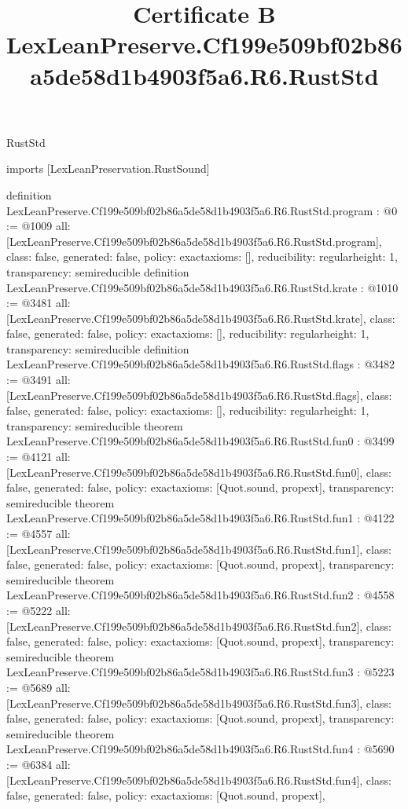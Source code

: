 \begin{lexlean}{RustStd}
\title{Certificate B LexLeanPreserve.Cf199e509bf02b86a5de58d1b4903f5a6.R6.RustStd}
\begin{coremodule}
imports [LexLeanPreservation.RustSound]

definition LexLeanPreserve.Cf199e509bf02b86a5de58d1b4903f5a6.R6.RustStd.program : @0 := @1009 {
  all: [LexLeanPreserve.Cf199e509bf02b86a5de58d1b4903f5a6.R6.RustStd.program],
  class: false,
  generated: false,
  policy: exact{axioms: []},
  reducibility: regular{height: 1},
  transparency: semireducible
}
definition LexLeanPreserve.Cf199e509bf02b86a5de58d1b4903f5a6.R6.RustStd.krate : @1010 := @3481 {
  all: [LexLeanPreserve.Cf199e509bf02b86a5de58d1b4903f5a6.R6.RustStd.krate],
  class: false,
  generated: false,
  policy: exact{axioms: []},
  reducibility: regular{height: 1},
  transparency: semireducible
}
definition LexLeanPreserve.Cf199e509bf02b86a5de58d1b4903f5a6.R6.RustStd.flags : @3482 := @3491 {
  all: [LexLeanPreserve.Cf199e509bf02b86a5de58d1b4903f5a6.R6.RustStd.flags],
  class: false,
  generated: false,
  policy: exact{axioms: []},
  reducibility: regular{height: 1},
  transparency: semireducible
}
theorem LexLeanPreserve.Cf199e509bf02b86a5de58d1b4903f5a6.R6.RustStd.fun0 : @3499 := @4121 {
  all: [LexLeanPreserve.Cf199e509bf02b86a5de58d1b4903f5a6.R6.RustStd.fun0],
  class: false,
  generated: false,
  policy: exact{axioms: [Quot.sound, propext]},
  transparency: semireducible
}
theorem LexLeanPreserve.Cf199e509bf02b86a5de58d1b4903f5a6.R6.RustStd.fun1 : @4122 := @4557 {
  all: [LexLeanPreserve.Cf199e509bf02b86a5de58d1b4903f5a6.R6.RustStd.fun1],
  class: false,
  generated: false,
  policy: exact{axioms: [Quot.sound, propext]},
  transparency: semireducible
}
theorem LexLeanPreserve.Cf199e509bf02b86a5de58d1b4903f5a6.R6.RustStd.fun2 : @4558 := @5222 {
  all: [LexLeanPreserve.Cf199e509bf02b86a5de58d1b4903f5a6.R6.RustStd.fun2],
  class: false,
  generated: false,
  policy: exact{axioms: [Quot.sound, propext]},
  transparency: semireducible
}
theorem LexLeanPreserve.Cf199e509bf02b86a5de58d1b4903f5a6.R6.RustStd.fun3 : @5223 := @5689 {
  all: [LexLeanPreserve.Cf199e509bf02b86a5de58d1b4903f5a6.R6.RustStd.fun3],
  class: false,
  generated: false,
  policy: exact{axioms: [Quot.sound, propext]},
  transparency: semireducible
}
theorem LexLeanPreserve.Cf199e509bf02b86a5de58d1b4903f5a6.R6.RustStd.fun4 : @5690 := @6384 {
  all: [LexLeanPreserve.Cf199e509bf02b86a5de58d1b4903f5a6.R6.RustStd.fun4],
  class: false,
  generated: false,
  policy: exact{axioms: [Quot.sound, propext]},
}
\end{coremodule}
\end{lexlean}
